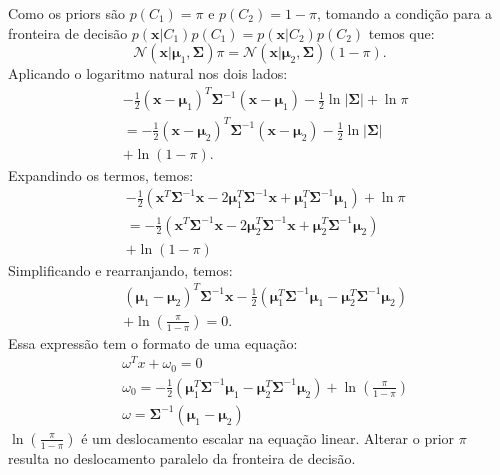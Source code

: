\documentclass[conference]{IEEEtran}
\begin{document}
Como os priors são $p(C_1) = \pi$ e $p(C_2) = 1 - \pi$, tomando a condição para a fronteira de decisão $p(\mathbf{x} | C_1) p(C_1) = p(\mathbf{x} | C_2) p(C_2)$ temos que:
\[
\mathcal{N}(\mathbf{x} | \boldsymbol{\mu}_1, \boldsymbol{\Sigma}) \pi = \mathcal{N}(\mathbf{x} | \boldsymbol{\mu}_2, \boldsymbol{\Sigma}) (1 - \pi).
\]
Aplicando o logaritmo natural nos dois lados:
\begin{align*}
& -\frac{1}{2} (\mathbf{x} - \boldsymbol{\mu}_1)^T \boldsymbol{\Sigma}^{-1} (\mathbf{x} - \boldsymbol{\mu}_1) - \frac{1}{2} \ln |\boldsymbol{\Sigma}| + \ln \pi \\
&= -\frac{1}{2} (\mathbf{x} - \boldsymbol{\mu}_2)^T \boldsymbol{\Sigma}^{-1} (\mathbf{x} - \boldsymbol{\mu}_2) - \frac{1}{2} \ln |\boldsymbol{\Sigma}|\\
& + \ln (1 - \pi).
\end{align*}
Expandindo os termos, temos:
\begin{align*}
& -\frac{1}{2} (\mathbf{x}^T \boldsymbol{\Sigma}^{-1} \mathbf{x} - 2 \boldsymbol{\mu}_1^T \boldsymbol{\Sigma}^{-1} \mathbf{x} + \boldsymbol{\mu}_1^T \boldsymbol{\Sigma}^{-1} \boldsymbol{\mu}_1) + \ln \pi \\
& = -\frac{1}{2} (\mathbf{x}^T \boldsymbol{\Sigma}^{-1} \mathbf{x} - 2 \boldsymbol{\mu}_2^T \boldsymbol{\Sigma}^{-1} \mathbf{x} + \boldsymbol{\mu}_2^T \boldsymbol{\Sigma}^{-1} \boldsymbol{\mu}_2) \\
& + \ln (1 - \pi)
\end{align*}
Simplificando e rearranjando, temos:
\begin{align*}
&  (\boldsymbol{\mu}_1 - \boldsymbol{\mu}_2)^T \boldsymbol{\Sigma}^{-1} \mathbf{x} - \frac{1}{2} (\boldsymbol{\mu}_1^T \boldsymbol{\Sigma}^{-1} \boldsymbol{\mu}_1 - \boldsymbol{\mu}_2^T \boldsymbol{\Sigma}^{-1} \boldsymbol{\mu}_2) \\
& + \ln \left(\frac{\pi}{1 - \pi}\right) = 0.
\end{align*}
  Essa expressão tem o formato de uma equação:
\begin{align*}
& \omega ^T x + \omega_0 = 0 \\
& \omega_0 = -\frac{1}{2} (\boldsymbol{\mu}_1^T \boldsymbol{\Sigma}^{-1} \boldsymbol{\mu}_1 - \boldsymbol{\mu}_2^T \boldsymbol{\Sigma}^{-1} \boldsymbol{\mu}_2) + \ln \left(\frac{\pi}{1 - \pi}\right) \\
& \omega = \boldsymbol{\Sigma}^{-1} (\boldsymbol{\mu}_1 - \boldsymbol{\mu}_2)
\end{align*}
$\ln \left(\frac{\pi}{1 - \pi}\right)$ é um deslocamento escalar na equação linear. Alterar o prior $\pi$ resulta no deslocamento paralelo da fronteira de decisão.
\end{document}
